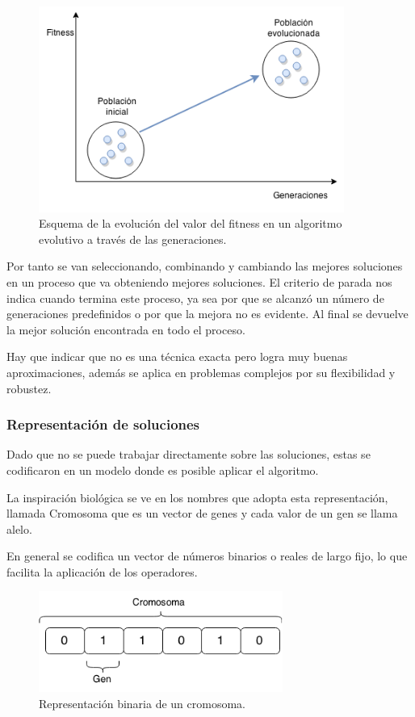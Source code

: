 \begin{figure}[H]
	\centering
	\includegraphics[width=10cm]{Figures/fitness_generaciones}
	\caption[Esquema de la evolución del valor del fitness en un algoritmo evolutivo ]{Esquema de la evolución del valor del fitness en un algoritmo evolutivo a través de las generaciones.}
	\label{fig:fitness_generaciones}
\end{figure}

Por tanto se van seleccionando, combinando y cambiando las mejores soluciones en un proceso que va obteniendo mejores soluciones.
El criterio de parada nos indica cuando termina este proceso, ya sea por que se alcanzó un número de generaciones predefinidos o por que la mejora no es evidente. Al final se devuelve la mejor solución encontrada en todo el proceso.

Hay que indicar que no es una técnica exacta pero logra muy buenas aproximaciones, además se aplica en problemas complejos por su flexibilidad y robustez. 

\subsubsection{Representación de soluciones}
Dado que no se puede trabajar directamente sobre las soluciones, estas se codificaron en un modelo donde es posible aplicar el algoritmo.

La inspiración biológica se ve en los nombres que adopta esta representación, llamada Cromosoma que es un vector de genes y cada valor de un gen se llama alelo.

En general se codifica un vector de números binarios o reales de largo fijo, lo que facilita la aplicación de los operadores.

\begin{figure}[H]
	\centering
	\includegraphics[width=8cm]{Figures/rep_binaria}
	\caption{Representación binaria de un cromosoma.}
	\label{fig:rep_binaria}
\end{figure}


